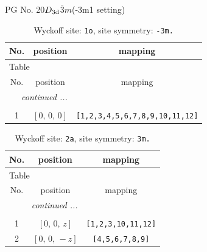 \documentclass[fleqn,8pt]{jsarticle}
\begin{document}
\setcounter{MaxMatrixCols}{32}

\renewcommand{\tablename}{Table~}
\renewcommand{\figurename}{Figure~}
\begin{center}
\LARGE
PG No. 20\quad$D_{\rm 3d}$\quad$\bar{3}m$\quad(-3m1 setting)\quad[ trigonal ]
\end{center}
\renewcommand{\arraystretch}{1.2}
\begin{longtable}{ccc}
\caption{Wyckoff site: {\tt 1o}, site symmetry: {\tt -3m.}}
 \\
 \hline \hline
No. & position & mapping \\ \hline \endfirsthead

\multicolumn{2}{l}{\tablename\ \thetable{}} \\
 \hline \hline
No. & position & mapping \\ \hline \endhead

 \hline \hline
\multicolumn{2}{r}{\footnotesize\it continued ...} \\ \endfoot

 \hline \hline
\multicolumn{2}{r}{} \\ \endlastfoot

1 & $\left[ 0,\, 0,\, 0 \right]$ & {\tt [1,2,3,4,5,6,7,8,9,10,11,12]} \\
\end{longtable}
\renewcommand{\arraystretch}{1.2}
\begin{longtable}{ccc}
\caption{Wyckoff site: {\tt 2a}, site symmetry: {\tt 3m.}}
 \\
 \hline \hline
No. & position & mapping \\ \hline \endfirsthead

\multicolumn{2}{l}{\tablename\ \thetable{}} \\
 \hline \hline
No. & position & mapping \\ \hline \endhead

 \hline \hline
\multicolumn{2}{r}{\footnotesize\it continued ...} \\ \endfoot

 \hline \hline
\multicolumn{2}{r}{} \\ \endlastfoot

1 & $\left[ 0,\, 0,\, z \right]$ & {\tt [1,2,3,10,11,12]} \\ \hline
2 & $\left[ 0,\, 0,\, - z \right]$ & {\tt [4,5,6,7,8,9]} \\
\end{longtable}
\renewcommand{\arraystretch}{1.2}
\end{document}
